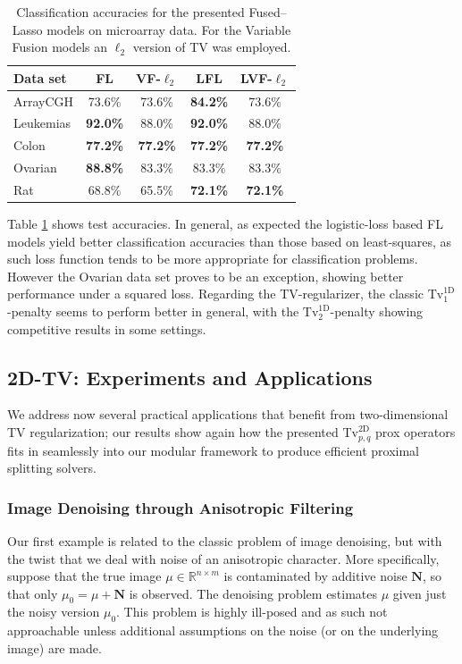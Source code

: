 \documentclass[twoside,11pt]{article}
\newcommand{\mn}{\bm{N}}
\def\abovestrut#1{\rule[0in]{0in}{#1}\ignorespaces}
\def\belowstrut#1{\rule[-#1]{0in}{#1}\ignorespaces}
\def\abovespace{\abovestrut{0.20in}}
\def\belowspace{\belowstrut{0.10in}}
\newcommand{\reals}{\mathbb{R}}
\newcommand{\tvell}{\text{Tv}}
\newcommand{\oned}{\text{1D}}
\newcommand{\twod}{\text{2D}}
\numberwithin{equation}{section}
\numberwithin{theorem}{section}
\begin{document}
\begin{table}[t]
\centering
\begin{tabular}{lcccc}
\hline
\abovespace\belowspace
 Data set & FL & VF-$\ell_2$ & LFL & LVF-$\ell_2$ \\
\hline
\abovespace
ArrayCGH &    73.6\%  &  73.6\% &  \bf{84.2\%} &  73.6\% \\
Leukemias &    \bf{92.0\%} &  88.0\% &  \bf{92.0\%} &  88.0\% \\
Colon &    \bf{77.2\%} &  \bf{77.2\%}  & \bf{77.2\%}  & \bf{77.2\%} \\
Ovarian &    \bf{88.8\%}  & 83.3\%  & 83.3\% &  83.3\% \\
\belowspace
Rat &    68.8\%  & 65.5\%  & \bf{72.1\%}  & \bf{72.1\%}
\\ \hline
\end{tabular}
\caption{Classification accuracies for the presented Fused--Lasso models on microarray data. For the Variable Fusion models an $\ell_2$ version of TV was employed.
\label{tab:FLreal}
}
\end{table}

Table \ref{tab:FLreal} shows test accuracies. In general, as expected the logistic-loss based FL models yield better classification accuracies than those based on least-squares, as such loss function tends to be more appropriate for classification problems. However the Ovarian data set proves to be an exception, showing better performance under a squared loss. Regarding the TV-regularizer, the classic $\tvell_1^{\oned}$-penalty seems to perform better in general, with the $\tvell_2^{\oned}$-penalty showing competitive results in some settings.

\subsection{2D-TV: Experiments and Applications}
\label{sec:2d.expt}
We address now several practical applications that benefit from two-dimensional TV regularization; our results show again how the presented $\tvell_{p,q}^{\twod}$ prox operators fits in seamlessly into our modular framework to produce efficient proximal splitting solvers.

\subsubsection{Image Denoising through Anisotropic Filtering}
\label{sec:aniso2D}
Our first example is related to the classic problem of image denoising, but with the twist that we deal with noise of an anisotropic character. More specifically, suppose that the true image $\mu \in \reals^{n \times m}$ is contaminated by additive noise $\mn$, so that only $\mu_0 = \mu + \mn$ is observed. The denoising problem estimates $\mu$ given just the noisy version $\mu_0$. This problem is highly ill-posed and as such not approachable unless additional assumptions on the noise (or on the underlying image) are made.
\end{document}
